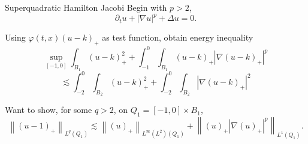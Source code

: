 \documentclass{beamer}
\newcommand{\eps}{\varepsilon}
\newcommand{\norm}[1]{\left\lVert#1\right\rVert}
\newcommand{\paren}[1]{\left( #1 \right)}
\newcommand{\abs}[1]{\left\lvert #1 \right\rvert}
\newcommand{\del}{\partial}
\newcommand{\grad}{\nabla}
\newcommand{\Laplace}{\Delta}
\begin{document}

\begin{frame}{Superquadratic Hamilton Jacobi}
Begin with $p > 2$,
\[ \del_t u + \abs{\grad u}^p + \Laplace u = 0. \]

Using $\varphi(t,x) (u-k)_+$ as test function, obtain energy inequality
\[ \sup_{[-1,0]} \int_{B_1} (u-k)_+^2 + \int_{-1}^0 \int_{B_1} (u-k)_+ \abs{\grad (u-k)_+}^p \]
\[ \lesssim \int_{-2}^0 \int_{B_2} (u-k)_+^2 + \int_{-2}^0 \int_{B_2} \abs{\grad (u-k)_+}^2 \]

Want to show, for some $q > 2$, on $Q_1 = [-1,0]\times B_1$,
\[ \norm{(u-1)_+}_{L^q(Q_1)} \lesssim \norm{(u)_+}_{L^\infty(L^2)(Q_1)} + \norm{(u)_+ |\grad (u)_+|^p}_{L^1(Q_1)}. \]

\end{frame}




\end{document}
